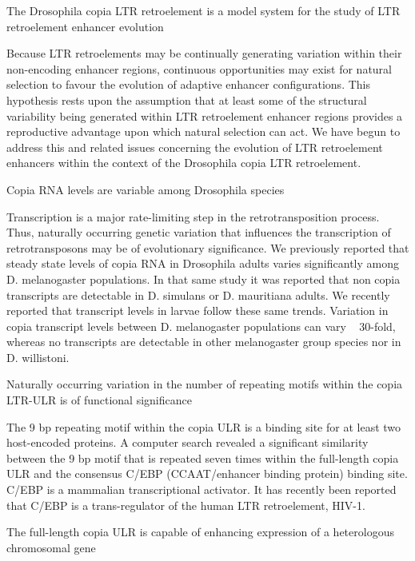 The Drosophila copia LTR retroelement is a model system for the study of LTR retroelement enhancer evolution

Because LTR retroelements may be continually generating variation within their non-encoding enhancer regions, continuous opportunities may exist for natural selection to favour the evolution of adaptive enhancer configurations. This hypothesis rests upon the assumption that at least some of the structural variability being generated within LTR retroelement enhancer regions provides a reproductive advantage upon which natural selection can act. We have begun to address this and related issues concerning the evolution of LTR retroelement enhancers within the context of the Drosophila copia LTR retroelement.

Copia RNA levels are variable among Drosophila species

Transcription is a major rate-limiting step in the retrotransposition process. Thus, naturally occurring genetic variation that influences the transcription of retrotransposons may be of evolutionary significance. We previously reported that steady state levels of copia RNA in Drosophila adults varies significantly among D. melanogaster populations. In that same study it was reported that non copia transcripts are detectable in D. simulans or D. mauritiana adults. We recently reported that transcript levels in larvae follow these same trends. Variation in copia transcript levels between D. melanogaster populations can vary ~ 30-fold, whereas no transcripts are detectable in other melanogaster group species nor in D. willistoni.

Naturally occurring variation in the number of repeating motifs within the copia LTR-ULR is of functional significance

The 9 bp repeating motif within the copia ULR is a binding site for at least two host-encoded proteins. A computer search revealed a significant similarity between the 9 bp motif that is repeated seven times within the full-length copia ULR and the consensus C/EBP (CCAAT/enhancer binding protein) binding site. C/EBP is a mammalian transcriptional activator. It has recently been reported that C/EBP is a trans-regulator of the human LTR retroelement, HIV-1.

The full-length copia ULR is capable of enhancing expression of a heterologous chromosomal gene

